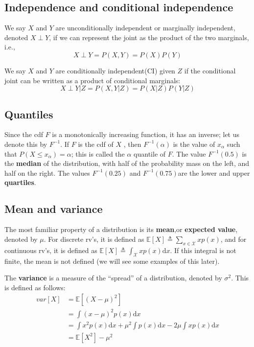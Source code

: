 \subsection{Independence and conditional independence}
We say $X$ and $Y$ are unconditionally independent or marginally independent, denoted $X \perp Y$, if we can represent the joint as the product of the two marginals, i.e.,
\begin{equation}
X \perp Y=P(X,Y)=P(X)P(Y)
\end{equation}

We say $X$ and $Y$ are conditionally independent(CI) given $Z$ if the conditional joint can be written as a product of conditional marginals:
\begin{equation}
X \perp Y|Z=P(X,Y|Z)=P(X|Z)P(Y|Z)
\end{equation}

\subsection{Quantiles}
Since the cdf $F$ is a monotonically increasing function, it has an inverse; let us denote this by $F^{-1}$. If $F$ is the cdf of $X$ , then $F^{-1}(\alpha)$ is the value of $x_{\alpha}$ such that $P(X \leq x_{\alpha})=\alpha$; this is called the $\alpha$ quantile of $F$. The value $F^{-1}(0.5)$ is the \textbf{median} of the distribution, with half of the probability mass on the left, and half on the right. The values $F^{-1}(0.25)$ and $F^{−1}(0.75)$are the lower and upper \textbf{quartiles}.

\subsection{Mean and variance}
The most familiar property of a distribution is its \textbf{mean},or \textbf{expected value}, denoted by $\mu$. For discrete rv’s, it is defined as $\mathbb{E}[X] \triangleq \sum_{x \in \mathcal{X}}xp(x)$, and for continuous rv’s, it is defined as $\mathbb{E}[X] \triangleq \int_{\mathcal{X}}xp(x)\mathrm{d}x$. If this integral is not finite, the mean is not defined (we will see some examples of this later). 

The \textbf{variance} is a measure of the “spread” of a distribution, denoted by $\sigma^2$. This is defined as follows:
\begin{align}
var[X]& =\mathbb{E}[(X-\mu)^2] \\
      & =\int{(x-\mu)^2p(x)\mathrm{d}x} \nonumber \\
      & =\int{x^2p(x)\mathrm{d}x}+{\mu}^2\int{p(x)\mathrm{d}x}-2\mu\int{xp(x)\mathrm{d}x} \nonumber \\
	  & =\mathbb{E}[X^2]-{\mu}^2
\end{align}

